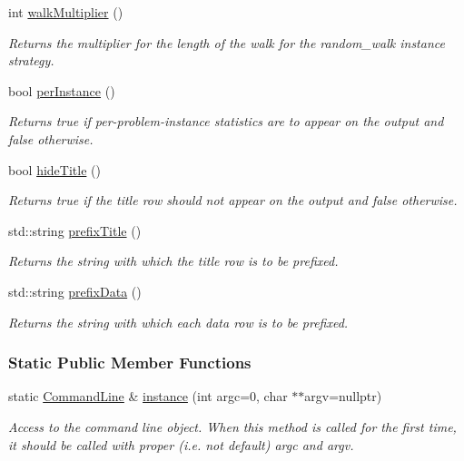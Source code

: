 \begin{DoxyCompactItemize}
int \hyperlink{structslb_1_1core_1_1commandLine_1_1CommandLine_abbc65189047fe4766289668731291a5d}{walk\+Multiplier} ()
\begin{DoxyCompactList}\small\item\em Returns the multiplier for the length of the walk for the random\+\_\+walk instance strategy. \end{DoxyCompactList}\item 
bool \hyperlink{structslb_1_1core_1_1commandLine_1_1CommandLine_aba20650577b010f9699c127e258821c3}{per\+Instance} ()
\begin{DoxyCompactList}\small\item\em Returns {\ttfamily true} if per-\/problem-\/instance statistics are to appear on the output and {\ttfamily false} otherwise. \end{DoxyCompactList}\item 
bool \hyperlink{structslb_1_1core_1_1commandLine_1_1CommandLine_a49a9a1dc9794bbabde1247dfdf056823}{hide\+Title} ()
\begin{DoxyCompactList}\small\item\em Returns {\ttfamily true} if the title row should not appear on the output and {\ttfamily false} otherwise. \end{DoxyCompactList}\item 
std\+::string \hyperlink{structslb_1_1core_1_1commandLine_1_1CommandLine_aea4d54aee80abe312965b0508751b925}{prefix\+Title} ()
\begin{DoxyCompactList}\small\item\em Returns the string with which the title row is to be prefixed. \end{DoxyCompactList}\item 
std\+::string \hyperlink{structslb_1_1core_1_1commandLine_1_1CommandLine_a0fde6d0c2ba0719bb6dacaab612c872b}{prefix\+Data} ()
\begin{DoxyCompactList}\small\item\em Returns the string with which each data row is to be prefixed. \end{DoxyCompactList}\end{DoxyCompactItemize}
\subsubsection*{Static Public Member Functions}
\begin{DoxyCompactItemize}
\item 
static \hyperlink{structslb_1_1core_1_1commandLine_1_1CommandLine}{Command\+Line} \& \hyperlink{structslb_1_1core_1_1commandLine_1_1CommandLine_a297df54d1f330d491717b487968b0fc5}{instance} (int argc=0, char $\ast$$\ast$argv=nullptr)
\begin{DoxyCompactList}\small\item\em Access to the command line object. When this method is called for the first time, it should be called with proper (i.\+e. not default) {\ttfamily argc} and {\ttfamily argv}. \end{DoxyCompactList}\end{DoxyCompactItemize}
